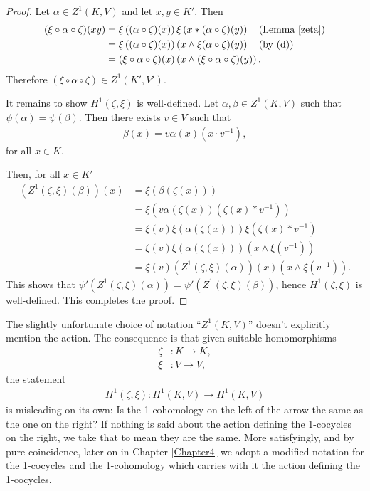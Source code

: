 \begin{proof}
	Let $\alpha \in Z^1(K, V)$ and let $x,y \in K'$. Then
	\begin{align*}
		(\xi \circ \alpha \circ \zeta)(xy) &= \xi \left((\alpha \circ \zeta)(x)\right) \xi \left(x \ast (\alpha \circ \zeta)(y)\right) \quad\textrm{(Lemma \ref{zeta})} \\
			&= \xi \left((\alpha \circ \zeta)(x)\right) \left(x \wedge \xi(\alpha \circ \zeta)(y)\right) \quad\textrm{(by (d))} \\
			&= (\xi \circ \alpha \circ \zeta)(x) \left(x \wedge (\xi \circ \alpha \circ \zeta)(y)\right).
	\end{align*}
	Therefore $(\xi \circ \alpha \circ \zeta) \in Z^1(K', V')$.

	It remains to show $H^1(\zeta, \xi)$ is well-defined. Let $\alpha,\beta \in Z^1(K, V)$ such that $\psi(\alpha) = \psi(\beta)$. Then there exists $v \in V$ such that
	\begin{align*}
		\beta(x) = v\alpha(x)(x \cdot v^{-1}),
	\end{align*}
	for all $x \in K$.

	Then, for all $x \in K'$
	\begin{align*}
		\left(Z^1(\zeta, \xi)(\beta)\right)(x) &= \xi\left(\beta(\zeta(x))\right) \\
			&= \xi \left( v \alpha(\zeta(x))\left(\zeta(x) \ast v^{-1}\right) \right) \\
			&= \xi(v) \xi(\alpha(\zeta(x))) \xi\left( \zeta(x) \ast v^{-1}\right) \\
			&= \xi(v) \xi(\alpha(\zeta(x)))\left(x \wedge \xi(v^{-1})\right) \\
			&= \xi(v) \left(Z^1(\zeta, \xi)(\alpha)\right)(x) \left(x \wedge \xi(v^{-1})\right).
	\end{align*}
	This shows that $\psi'\left(Z^1(\zeta, \xi)(\alpha)\right) = \psi'\left(Z^1(\zeta, \xi)(\beta)\right)$, hence $H^1(\zeta, \xi)$ is well-defined. This completes the proof.
\end{proof} 

\begin{remark}
	The slightly unfortunate choice of notation ``$Z^1(K, V)$'' doesn't explicitly mention the action. The consequence is that given suitable homomorphisms
	\begin{align*}
		\zeta&:K \rightarrow K, \\
		\xi&: V \rightarrow V,
	\end{align*}
	the statement
	\begin{align*}
		H^1(\zeta, \xi):H^1(K, V) \rightarrow H^1(K, V)
	\end{align*}
	is misleading on its own: Is the 1-cohomology on the left of the arrow the same as the one on the right? If nothing is said about the action defining the 1-cocycles on the right, we take that to mean they are the same. More satisfyingly, and by pure coincidence, later on in Chapter \ref{Chapter4} we adopt a modified notation for the 1-cocycles and the 1-cohomology which carries with it the action defining the 1-cocycles.
\end{remark}

